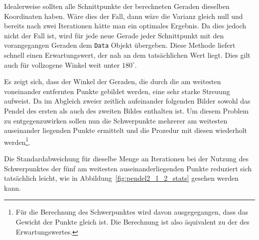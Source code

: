 Idealerweise sollten alle Schnittpunkte der berechneten Geraden dieselben Koordinaten haben.
Wäre dies der Fall, dann wäre die Varianz gleich null und bereits nach zwei Iterationen hätte man ein optimales Ergebnis.
Da dies jedoch nicht der Fall ist, wird für jede neue Gerade jeder Schnittpunkt mit den vorangegangen Geraden dem \lstinline{Data} Objekt übergeben.
Diese Methode liefert schnell einen Erwartungswert, der nah an dem tatsächlichen Wert liegt.
Dies gilt auch für vollzogene Winkel weit unter $180^\circ$.

Es zeigt sich, dass der Winkel der Geraden, die durch die am weitesten voneinander entfernten Punkte gebildet werden, eine sehr starke Streuung aufweist.
Da im Abgleich zweier zeitlich aufeinander folgenden Bilder sowohl das Pendel des ersten als auch des zweiten Bildes enthalten ist.
Um diesem Problem zu entgegenzuwirken sollen nun die Schwerpunkte mehrerer am weitesten auseinander liegenden Punkte ermittelt und die Prozedur mit diesen wiederholt werden\footnote{Für die Berechnung des Schwerpunktes wird davon ausgegegangen, dass das Gewicht der Punkte gleich ist. Die Berechnung ist also äquivalent zu der des Erwartungswertes.}.

Die Standardabweichung für dieselbe Menge an Iterationen bei der Nutzung des Schwerpunktes der fünf am weitesten auseinanderliegenden Punkte reduziert sich tatsächlich leicht, wie in Abbildung~\ref{fig:pendel2_1_2_stats} gesehen werden kann.


